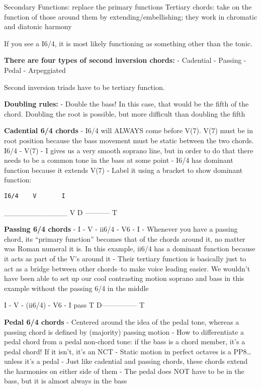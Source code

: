 \documentclass{book}
\begin{document}
Secondary Functions: replace the primary functions Tertiary chords: take on
the function of those around them by extending/embellishing; they work in
chromatic and diatonic harmony

If you see a I6/4, it is most likely functioning as something other than the
tonic.

\textbf{There are four types of second inversion chords:} - Cadential -
Passing - Pedal - Arpeggiated

Second inversion triads have to be tertiary function.

\textbf{Doubling rules:} - Double the bass! In this case, that would be the
fifth of the chord. Doubling the root is possible, but more difficult than
doubling the fifth

\textbf{Cadential 6/4 chords} - I6/4 will ALWAYS come before V(7). V(7) must
be in root position because the bass movement must be static between the two
chords. I6/4 - V(7) - I gives us a very smooth soprano line, but in order to
do that there needs to be a common tone in the bass at some point - I6/4 has
dominant function because it extends V(7) - Label it using a bracket to show
dominant function:

\begin{verbatim}
I6/4    V       I
\end{verbatim}

\textbar\_\_\_\_\_\_\_\_\_\_\_\_\textbar{} V D ----------- T

\textbf{Passing 6/4 chords} - I - V - ii6/4 - V6 - I - Whenever you have a
passing chord, its ``primary function'' becomes that of the chords around it,
no matter was Roman numeral it is. In this example, ii6/4 has a dominant
function because it acts as part of the V's around it - Their tertiary
function is basically just to act as a bridge between other chords--to make
voice leading easier. We wouldn't have been able to set up our cool
contrasting motion soprano and bass in this example without the passing 6/4 in
the middle

I - V - (ii6/4) - V6 - I pass T D--------------- T

\textbf{Pedal 6/4 chords} - Centered around the idea of the pedal tone,
whereas a passing chord is defined by (majority) passing motion - How to
differentiate a pedal chord from a pedal non-chord tone: if the bass is a
chord member, it's a pedal chord! If it isn't, it's an NCT - Static motion in
perfect octaves is a PP8\ldots unless it's a pedal - Just like cadential and
passing chords, these chords extend the harmonies on either side of them - The
pedal does NOT have to be in the bass, but it is almost always in the bass
\end{document}
